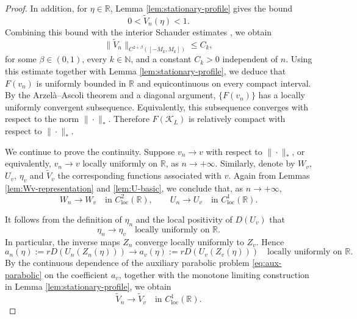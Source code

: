 \documentclass[preprint,sort&compress,final,12pt]{elsarticle}
\numberwithin{equation}{section}
\begin{document}
\begin{proof}
In addition, for $\eta\in\mathbb{R}$, Lemma 
\ref{lem:stationary-profile} gives the bound
\begin{equation*}
0<\widetilde V_n(\eta)<1.
\end{equation*}
Combining this bound with the interior Schauder estimates \cite[Chapter 6, Theorem 6.2 and Corollary 6.3]{Trudinger}, we obtain
\begin{equation*}
\|\widetilde V_n\|_{C^{2+\beta}([-M_k,M_k])}\le C_k,
\end{equation*}
for some $\beta\in(0,1)$, every $k\in\mathbb N$, and a constant $C_k>0$ independent of $n$. Using this estimate together with Lemma 
\ref{lem:stationary-profile}, we deduce that $F(v_n)$ is uniformly bounded in $\mathbb{R}$ and equicontinuous on every compact interval. By the Arzel\`a--Ascoli theorem and a diagonal argument, $\{F(v_n)\}$ has a locally uniformly convergent subsequence. Equivalently, this subsequence converges with respect to the norm $\|\cdot\|_*$. Therefore $F(\mathcal K_L)$ is relatively compact with respect to $\|\cdot\|_*$.

We continue to prove the continuity. Suppose $v_n\to v$ with respect to $\|\cdot\|_*$, or equivalently, $v_n\to v$ locally uniformly on $\mathbb R$, as $n\to+\infty$. Similarly, denote by $W_v$, $U_v$, $\eta_v$ and $\widetilde V_v$ the corresponding functions associated with $v$. Again from Lemmas \ref{lem:Wv-representation} and \ref{lem:U-basic}, we conclude that, as $n\to+\infty$,
\begin{equation*}
W_n\to W_v \quad\text{in }C^2_{\mathrm{loc}}(\mathbb R),\qquad U_n\to U_v \quad\text{in }C^1_{\mathrm{loc}}(\mathbb R).
\end{equation*}

It follows from the definition of $\eta_n$ and the local positivity of $D(U_v)$ that
\begin{equation*}
\eta_n\to\eta_v \quad\text{locally uniformly on }\mathbb R.
\end{equation*}
In particular, the inverse maps $Z_n$ converge locally uniformly to $Z_v$. Hence
\begin{equation*}
a_n(\eta):=rD(U_n(Z_n(\eta)))\to a_v(\eta):=rD(U_v(Z_v(\eta)))
\quad\text{locally uniformly on }\mathbb R.
\end{equation*}
By the continuous dependence of the auxiliary parabolic problem \eqref{eq:aux-parabolic} on the coefficient $a_v$, together with the monotone limiting construction in Lemma \ref{lem:stationary-profile}, we obtain
\begin{equation*}
\widetilde V_n\to \widetilde V_v \quad\text{in }C^1_{\mathrm{loc}}(\mathbb R).
\end{equation*}


\end{proof}
\end{document}
